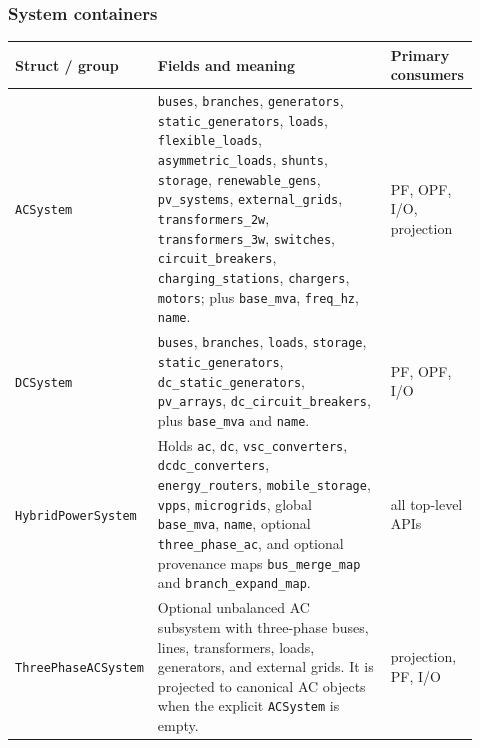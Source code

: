 \subsubsection*{System containers}
\begin{longtable}{L{0.20\linewidth}L{0.53\linewidth}L{0.19\linewidth}}
\toprule
Struct / group & Fields and meaning & Primary consumers \\
\midrule
\endhead
\texttt{ACSystem} & \texttt{buses}, \texttt{branches}, \texttt{generators}, \texttt{static\_generators}, \texttt{loads}, \texttt{flexible\_loads}, \texttt{asymmetric\_loads}, \texttt{shunts}, \texttt{storage}, \texttt{renewable\_gens}, \texttt{pv\_systems}, \texttt{external\_grids}, \texttt{transformers\_2w}, \texttt{transformers\_3w}, \texttt{switches}, \texttt{circuit\_breakers}, \texttt{charging\_stations}, \texttt{chargers}, \texttt{motors}; plus \texttt{base\_mva}, \texttt{freq\_hz}, \texttt{name}. & PF, OPF, I/O, projection \\
\texttt{DCSystem} & \texttt{buses}, \texttt{branches}, \texttt{loads}, \texttt{storage}, \texttt{static\_generators}, \texttt{dc\_static\_generators}, \texttt{pv\_arrays}, \texttt{dc\_circuit\_breakers}, plus \texttt{base\_mva} and \texttt{name}. & PF, OPF, I/O \\
\texttt{HybridPowerSystem} & Holds \texttt{ac}, \texttt{dc}, \texttt{vsc\_converters}, \texttt{dcdc\_converters}, \texttt{energy\_routers}, \texttt{mobile\_storage}, \texttt{vpps}, \texttt{microgrids}, global \texttt{base\_mva}, \texttt{name}, optional \texttt{three\_phase\_ac}, and optional provenance maps \texttt{bus\_merge\_map} and \texttt{branch\_expand\_map}. & all top-level APIs \\
\texttt{ThreePhaseACSystem} & Optional unbalanced AC subsystem with three-phase buses, lines, transformers, loads, generators, and external grids.  It is projected to canonical AC objects when the explicit \texttt{ACSystem} is empty. & projection, PF, I/O \\
\bottomrule
\end{longtable}


